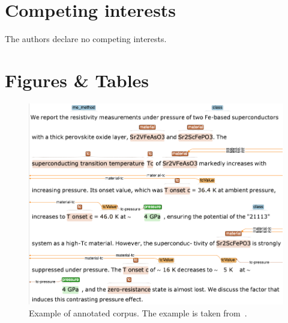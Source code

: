 \documentclass[fleqn,10pt]{wlscirep}
\begin{document}
\section*{Competing interests} 

The authors declare no competing interests.

\section*{Figures \& Tables}

\begin{figure}[ht]
  \centering
  \includegraphics[width=\linewidth]{example-annotated-corpus-postprocess.png}
  \caption{Example of annotated corpus. The example is taken from~\cite{Kotegawa2009ContrastingPE}.}
  \label{fig:example-annotations-and-links}
\end{figure}

\end{document}
